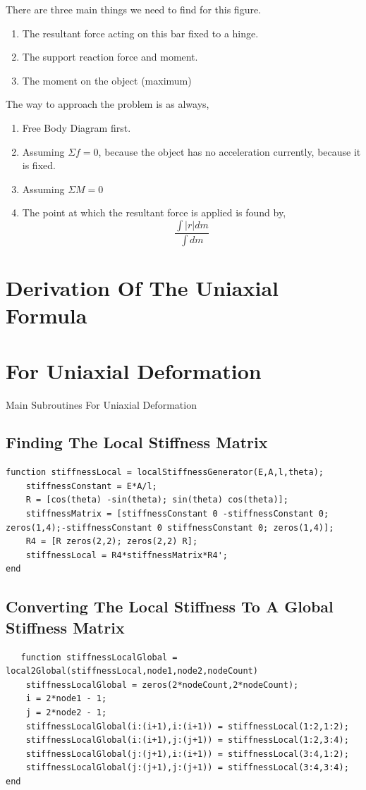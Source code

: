 \documentclass{report}
\begin{document}
There are three main things we need to find for this figure. 
\begin{enumerate}
  \item The resultant force acting on this bar fixed to a hinge. 
  \item The support reaction force and moment.
  \item The moment on the object (maximum)
\end{enumerate}
The way to approach the problem is as always,
\begin{enumerate}
  \item Free Body Diagram first. 
  \item Assuming $\Sigma f = 0 $, because the object has no acceleration currently, because it is fixed.
  \item Assuming $\Sigma M = 0$
  \item The point at which the resultant force is applied is found by, 
    \[
      \frac{\int |r|dm}{\int dm}
    \]
\end{enumerate}
\section{Derivation Of The Uniaxial Formula}
\section{For Uniaxial Deformation} %


\label{sec:for_uniaxial_deformation}
Main Subroutines For Uniaxial Deformation
\subsection{Finding The Local Stiffness Matrix} %
\begin{verbatim}
function stiffnessLocal = localStiffnessGenerator(E,A,l,theta);
    stiffnessConstant = E*A/l;
    R = [cos(theta) -sin(theta); sin(theta) cos(theta)];
    stiffnessMatrix = [stiffnessConstant 0 -stiffnessConstant 0; zeros(1,4);-stiffnessConstant 0 stiffnessConstant 0; zeros(1,4)];
    R4 = [R zeros(2,2); zeros(2,2) R];
    stiffnessLocal = R4*stiffnessMatrix*R4';
end
\end{verbatim}
\label{sec:finding_the_local_stiffness_matrix}
\subsection{Converting The Local Stiffness To A Global Stiffness Matrix}
\begin{verbatim}
   function stiffnessLocalGlobal = local2Global(stiffnessLocal,node1,node2,nodeCount)
    stiffnessLocalGlobal = zeros(2*nodeCount,2*nodeCount);
    i = 2*node1 - 1;
    j = 2*node2 - 1;
    stiffnessLocalGlobal(i:(i+1),i:(i+1)) = stiffnessLocal(1:2,1:2);
    stiffnessLocalGlobal(i:(i+1),j:(j+1)) = stiffnessLocal(1:2,3:4);
    stiffnessLocalGlobal(j:(j+1),i:(i+1)) = stiffnessLocal(3:4,1:2);
    stiffnessLocalGlobal(j:(j+1),j:(j+1)) = stiffnessLocal(3:4,3:4);
end
\end{verbatim}
\end{document}
